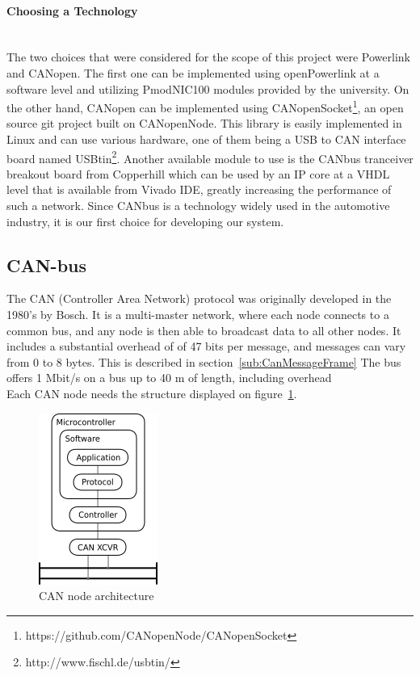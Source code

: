 \paragraph{Choosing a Technology}~\\
The two choices that were considered for the scope of this project were Powerlink and CANopen.
The first one can be implemented using openPowerlink at a software level and utilizing PmodNIC100 modules provided by the university.
On the other hand, CANopen can be implemented using CANopenSocket\footnote{https://github.com/CANopenNode/CANopenSocket}, an open source git project built on CANopenNode.
This library is easily implemented in Linux and can use various hardware, one of them being a USB to CAN interface board named USBtin\footnote{http://www.fischl.de/usbtin/}.
Another available module to use is the CANbus tranceiver breakout board from Copperhill which can be used by an IP core at a VHDL level that is available from Vivado IDE, greatly increasing the performance of such a network.
Since CANbus is a technology widely used in the automotive industry, it is our first choice for developing our system.



\subsection{CAN-bus}
The CAN (Controller Area Network) protocol was originally developed in the 1980's by Bosch.
It is a multi-master network, where each node connects to a common bus, and any node is then able to broadcast data to all other nodes.
It includes a substantial overhead of of 47 bits per message, and messages can vary from 0 to 8 bytes.
This is described in section~\ref{sub:CanMessageFrame}
The bus offers 1 Mbit/s on a bus up to 40 m of length, including overhead\\

Each CAN node needs the structure displayed on figure~\ref{fig:canbus_setup}.

\begin{figure}[h!]
	\centering
	\includegraphics{graphics/canbus_setup}
	\caption{CAN node architecture}
	\label{fig:canbus_setup}
\end{figure}

